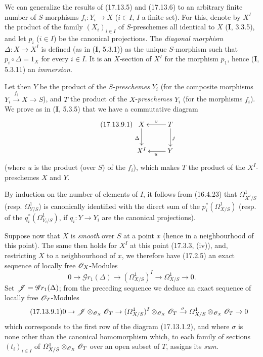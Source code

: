 \begin{env}[17.13.9]
\label{IV.17.13.9}
We can generalize the results of (17.13.5) and (17.13.6) to an arbitrary finite number of $S$-morphisms $f_i:Y_i\to X$ ($i\in I$, $I$ a finite set). For this, denote by $X^I$ the product of the family $(X_i)_{i\in I}$ of $S$-preschemes all identical to $X$ (\textbf{I}, 3.3.5), and let $p_i$ ($i\in I$) be the canonical projections. The \emph{diagonal morphism} $\Delta:X\to X^I$ is defined (as in (\textbf{I}, 5.3.1)) as the unique $S$-morphism such that $p_i\circ\Delta=1_X$ for every $i\in I$. It is an $X$-section of $X^I$ for the morphism $p_1$, hence (\textbf{I}, 5.3.11) an \emph{immersion}.


Let then $Y$ be the product of the $S$-\emph{preschemes} $Y_i$ (for the composite morphisms $Y_i\xrightarrow{f_i}X\to S$), and $T$ the product of the $X$-\emph{preschemes} $Y_i$ (for the morphisms $f_i$). We prove as in (\textbf{I}, 5.3.5) that we have a commutative diagram
\[
\label{IV.17.13.9.1}
\tag{17.13.9.1}
\xymatrix{
  X \ar[d]_{\Delta} & T \ar[l]_-v \ar[d]^{j}\\
  X^I & Y \ar[l]^{u}
}
\]
(where $u$ is the product (over $S$) of the $f_i$), which makes $T$ the product of the $X^I$-preschemes $X$ and $Y$.

By induction on the number of elements of $I$, it follows from (16.4.23) that $\varOmega^1_{X^I/S}$ (resp. $\varOmega^1_{Y/S}$) is canonically identified with the direct sum of the $p_i^*(\varOmega^1_{X/S})$ (resp. of the $q_i^*(\varOmega^1_{Y_i/S})$, if $q_i:Y\to Y_i$ are the canonical projections).

Suppose now that $X$ is \emph{smooth} over $S$ at a point $x$ (hence in a neighbourhood of this point). The same then holds for $X^I$ at this point (17.3.3, (iv)), and, restricting $X$ to a neighbourhood of $x$, we therefore have (17.2.5) an exact sequence of locally free $\mathscr{O}_X$-Modules
\[
0\to\mathscr{G}r_1(\Delta)\to(\varOmega^1_{X/S})^I\to\varOmega^1_{X/S}\to0.
\]
Set $\mathscr{J}=\mathscr{G}r_1(\Delta)$; from the preceding sequence we deduce an exact sequence of locally free $\mathscr{O}_T$-Modules
\[
\label{IV.17.13.9.1-seq}
\tag{17.13.9.1}
0\to\mathscr{J}\otimes_{\mathscr{O}_X}\mathscr{O}_T\to(\varOmega^1_{X/S})^I\otimes_{\mathscr{O}_X}\mathscr{O}_T\xrightarrow{\sigma}\varOmega^1_{X/S}\otimes_{\mathscr{O}_X}\mathscr{O}_T\to0
\]
which corresponds to the first row of the diagram (17.13.1.2), and where $\sigma$ is none other than the canonical homomorphism which, to each family of sections $(t_i)_{i\in I}$ of $\varOmega^1_{X/S}\otimes_{\mathscr{O}_X}\mathscr{O}_T$ over an open subset of $T$, assigns its \emph{sum}.


\end{env}
